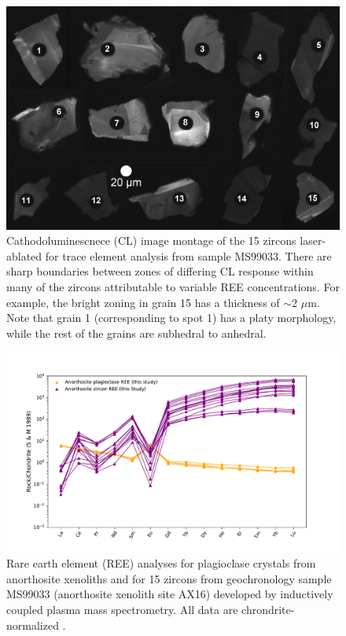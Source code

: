 \begin{figure}[h!]
\noindent\includegraphics[width=\textwidth]{figure/Zhang2021/CL_montage.png}
\centering
\caption{\footnotesize{Cathodoluminescnece (CL) image montage of the 15 zircons laser-ablated for trace element analysis from sample MS99033. There are sharp boundaries between zones of differing CL response within many of the zircons attributable to variable REE concentrations. For example, the bright zoning in grain 15 has a thickness of $\sim$2 $\mu$m. Note that grain 1 (corresponding to spot 1) has a platy morphology, while the rest of the grains are subhedral to anhedral.}}
\label{fig:CL_image}
\end{figure}

\begin{figure}[h!]
\noindent\includegraphics[width=\textwidth]{figure/Zhang2021/REE.pdf}
\centering
\caption{\footnotesize{Rare earth element (REE) analyses for plagioclase crystals from anorthosite xenoliths and for 15 zircons from geochronology sample MS99033 (anorthosite xenolith site AX16) developed by inductively coupled plasma mass spectrometry. All data are chrondrite-normalized \citep{Sun1989a}.}}
\label{fig:REE}
\end{figure}

